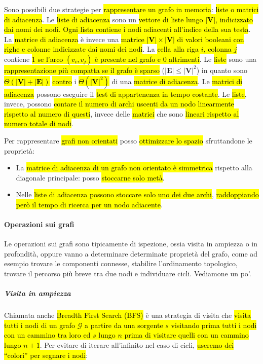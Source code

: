 \documentclass[a4paper,11pt,oneside]{article}
\theoremstyle{plain}
\theoremstyle{definition}
\theoremstyle{remark}
\begin{document}
Sono possibili due strategie per \hl{rappresentare un grafo in memoria}:
\hl{liste o matrici di adiacenza}. Le \hl{liste di adiacenza} sono un
\hl{vettore di liste lungo $|\mathbf{V}|$, indicizzato dai nomi dei nodi. Ogni
lista contiene i nodi adiacenti all'indice della sua testa}. La \hl{matrice di
adiacenza} è invece una \hl{matrice $|\mathbf{V}| \times |\mathbf{V}|$ di valori
booleani con righe e colonne indicizzate dai nomi dei nodi}. La \hl{cella alla
riga $i$, colonna $j$} contiene \hl{$1$ se l'arco $(v_i, v_j)$ è presente nel
grafo e $0$ altrimenti}. Le \hl{liste} sono una \hl{rappresentazione più
compatta se il grafo è sparso} ($|\mathbf{E}| \leq {|\mathbf{V}|}^2$) in quanto
sono \hl{$\Theta(|\mathbf{V}| + |\mathbf{E}|)$} \hl{contro} i
\hl{$\Theta({|\mathbf{V}|}^2)$} di una \hl{matrice di adiacenza}. Le \hl{matrici
di adiacenza} possono eseguire il \hl{test di appartenenza in tempo costante}.
Le \hl{liste}, invece, possono \hl{contare il numero di archi uscenti da un nodo
linearmente rispetto al numero di questi}, invece delle \hl{matrici} che sono
\hl{lineari rispetto al numero totale di nodi}.

Per rappresentare \hl{grafi non orientati} posso \hl{ottimizzare lo spazio}
sfruttandone le proprietà:

\begin{itemize}
  \item La \hl{matrice di adiacenza di un grafo non orientato è simmetrica}
    rispetto alla diagonale principale: posso \hl{stoccarne solo metà}.
  \item Nelle \hl{liste di adiacenza possono stoccare solo uno dei due archi},
    \hl{raddoppiando però il tempo di ricerca per un nodo adiacente}.
\end{itemize}

\paragraph{Operazioni sui grafi} Le operazioni sui grafi sono tipicamente di
ispezione, ossia visita in ampiezza o in profondità, oppure vanno a determinare
determinate proprietà del grafo, come ad esempio trovare le componenti connesse,
stabilire l'ordinamento topologico, trovare il percorso più breve tra due nodi e
individuare cicli. Vediamone un po'.

\subparagraph{Visita in ampiezza} Chiamata anche \hl{Breadth First Search (BFS)} è
una strategia di visita che \hl{visita tutti i nodi di un grafo $\mathcal{G}$ a
partire da una sorgente $s$ visitando prima tutti i nodi con un cammino tra loro
ed $s$ lungo $n$ prima di visitare quelli con un cammino lungo $n+1$}. Per
evitare di iterare all'infinito nel caso di cicli, \hl{useremo dei ``colori'' per
segnare i nodi}:
\end{document}
